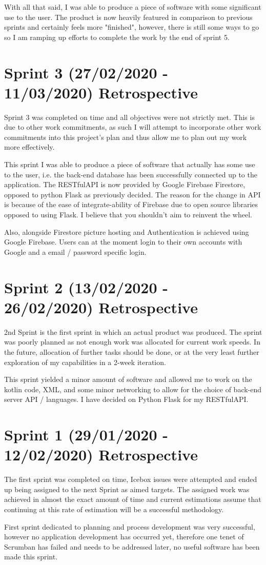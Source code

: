 With all that said, I was able to produce a piece of software with some significant use to the user. The product is now heavily featured in comparison to previous sprints and certainly feels more "finished", however, there is still some ways to go so I am ramping up efforts to complete the work by the end of sprint 5.

\section{Sprint 3 (27/02/2020 - 11/03/2020) Retrospective}
Sprint 3 was completed on time and all objectives were not strictly met. This is due to other work commitments, as such I will attempt to incorporate other work commitments into this project's plan and thus allow me to plan out my work more effectively.

This sprint I was able to produce a piece of software that actually has some use to the user, i.e. the back-end database has been successfully connected up to the application. The RESTfulAPI is now provided by Google Firebase Firestore, opposed to python Flask as previously decided. The reason for the change in API is because of the ease of integrate-ability of Firebase due to open source libraries opposed to using Flask. I believe that you shouldn't aim to reinvent the wheel.

Also, alongside Firestore picture hosting and Authentication is achieved using Google Firebase. Users can at the moment login to their own accounts with Google and a email / password specific login.

\section{Sprint 2 (13/02/2020 - 26/02/2020) Retrospective}
2nd Sprint is the first sprint in which an actual product was produced. The sprint was poorly planned as not enough work was allocated for current work speeds. In the future, allocation of further tasks should be done, or at the very least further exploration of my capabilities in a 2-week iteration.

This sprint yielded a minor amount of software and allowed me to work on the kotlin code, XML, and some minor networking to allow for the choice of back-end server API / languages. I have decided on Python Flask for my RESTfulAPI.

\section{Sprint 1 (29/01/2020 - 12/02/2020) Retrospective}

The first sprint was completed on time, Icebox issues were attempted and ended up being assigned to the next Sprint as aimed targets. The assigned work was achieved in almost the exact amount of time and current estimations assume that continuing at this rate of estimation will be a successful methodology. 

First sprint dedicated to planning and process development was very successful, however no application development has occurred yet, therefore one tenet of Scrumban has failed and needs to be addressed later, no useful software has been made this sprint.